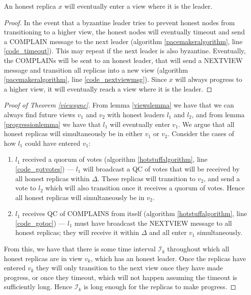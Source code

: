\begin{lemma} \label{progressionlemma}
	An honest replica $x$ will eventually enter a view where it is the leader.
\end{lemma}

\begin{proof}
	In the event that a byzantine leader tries to prevent honest nodes from transitioning to a higher view, the honest nodes will eventually timeout and send a COMPLAIN message to the next leader (algorithm \ref{pacemakeralgorithm}, line \ref{code_timeout}). This may repeat if the next leader is also byzantine. Eventually, the COMPLAINs will be sent to an honest leader, that will send a NEXT{\large V}IEW message and transition all replicas into a new view (algorithm \ref{pacemakeralgorithm}, line \ref{code_nextviewmsg}). Since $x$ will always progress to a higher view, it will eventually reach a view where it is the leader.
\end{proof}

\begin{proof}[Proof of Theorem \ref{viewsync}]
	From lemma \ref{viewslemma} we have that we can always find future views $v_1$ and $v_2$ with honest leaders $l_1$ and $l_2$, and from lemma \ref{progressionlemma} we have that $l_1$ will eventually enter $v_1$. We argue that all honest replicas will simultaneously be in either $v_1$ or $v_2$. Consider the cases of how $l_1$ could have entered $v_1$:
	\begin{enumerate}
		\item $l_1$ received a quorum of votes (algorithm \ref{hotstuffalgorithm}, line \ref{code_gotvotes}) --- $l_1$ will broadcast a QC of votes that will be received by all honest replicas within $\Delta$. These replicas will transition to $v_2$, and send a vote to $l_2$ which will also transition once it receives a quorum of votes. Hence all honest replicas will simultaneously be in $v_2$.
		\item $l_1$ receives QC of COMPLAINS from itself (algorithm \ref{hotstuffalgorithm}, line \ref{code_gotqc}) --- $l_1$ must have broadcast the NEXT{\large V}IEW message to all honest replicas; they will receive it within $\Delta$ and all enter $v_1$ simultaneously.
	\end{enumerate}
	From this, we have that there is some time interval $\mathcal{I}_k$ throughout which all honest replicas are in view $v_k$, which has an honest leader. Once the replicas have entered $v_k$ they will only transition to the next view once they have made progress, or once they timeout, which will not happen assuming the timeout is sufficiently long. Hence $\mathcal{I}_k$ is long enough for the replicas to make progress.
\end{proof}

